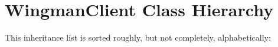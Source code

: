 \section{Wingman\-Client Class Hierarchy}
This inheritance list is sorted roughly, but not completely, alphabetically:\begin{CompactList}
\item {}
\begin{CompactList}
\item {}
\end{CompactList}
\end{CompactList}
